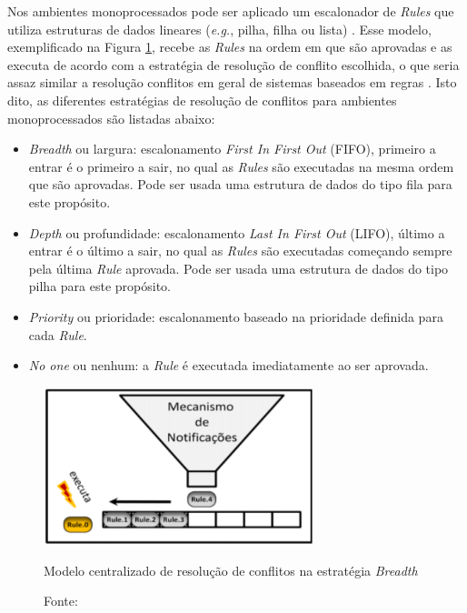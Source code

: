 Nos ambientes monoprocessados pode ser aplicado um escalonador de \textit{Rules}
que utiliza estruturas de dados lineares (\textit{e.g.}, pilha, filha ou lista)
\cite{msc_Banaszewski_2009}. Esse modelo, exemplificado na Figura
\ref{fig:conflitos}, recebe as \textit{Rules} na ordem em que são aprovadas e as
executa de acordo com a estratégia de resolução de conflito escolhida, o que
seria assaz similar a resolução conflitos em geral de sistemas baseados em
regras \cite{msc_Banaszewski_2009}. Isto dito, as diferentes estratégias de
resolução de conflitos para ambientes monoprocessados são listadas abaixo:

\begin{itemize}
  \item \textit{Breadth} ou largura: escalonamento \textit{First In First Out}
        (FIFO), primeiro a entrar é o primeiro a sair, no qual as \textit{Rules}
        são executadas na mesma ordem que são aprovadas. Pode ser usada uma
        estrutura de dados do tipo fila para este propósito.
  \item \textit{Depth} ou profundidade: escalonamento \textit{Last In First Out}
        (LIFO), último a entrar é o último a sair, no qual as \textit{Rules}
        são executadas começando sempre pela última \textit{Rule} aprovada. Pode
        ser usada uma estrutura de dados do tipo pilha para este propósito.
  \item \textit{Priority} ou prioridade: escalonamento baseado na prioridade definida para
        cada \textit{Rule}.
  \item \textit{No one} ou nenhum: a \textit{Rule} é executada imediatamente ao ser
        aprovada.
\end{itemize}

\begin{figure}[!htb]
  \centering
  \includegraphics[width=0.7\textwidth]{../figures/conflitos.png}
  \smallskip
  \caption{Modelo centralizado de resolução de conflitos na estratégia
    \textit{Breadth}} \caption*{Fonte: }
  \label{fig:conflitos}
\end{figure}

